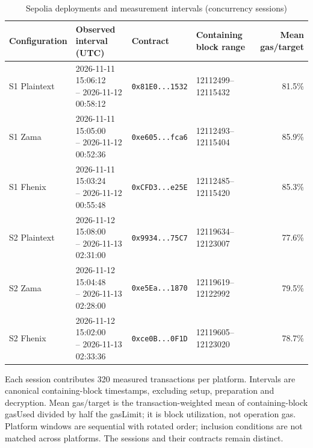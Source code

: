 \begin{table}[!t]
\caption{Sepolia deployments and measurement intervals (concurrency sessions)}
\label{tab:sepolia-concurrency-deployments}
\centering
\scriptsize
\setlength{\tabcolsep}{3pt}
\begin{tabular}{|l|l|l|l|r|}
\hline
\textbf{Configuration} & \textbf{Observed interval (UTC)} & \textbf{Contract} & \textbf{Containing block range} & \textbf{Mean gas/target} \\
\hline
S1 Plaintext & \shortstack[l]{2026-11-11 15:06:12 \\ -- 2026-11-12 00:58:12} & \texttt{0x81E0...1532} & 12112499--12115432 & 81.5\% \\
\hline
S1 Zama & \shortstack[l]{2026-11-11 15:05:00 \\ -- 2026-11-12 00:52:36} & \texttt{0xe605...fca6} & 12112493--12115404 & 85.9\% \\
\hline
S1 Fhenix & \shortstack[l]{2026-11-11 15:03:24 \\ -- 2026-11-12 00:55:48} & \texttt{0xCFD3...e25E} & 12112485--12115420 & 85.3\% \\
\hline
S2 Plaintext & \shortstack[l]{2026-11-12 15:08:00 \\ -- 2026-11-13 02:31:00} & \texttt{0x9934...75C7} & 12119634--12123007 & 77.6\% \\
\hline
S2 Zama & \shortstack[l]{2026-11-12 15:04:48 \\ -- 2026-11-13 02:28:00} & \texttt{0xe5Ea...1870} & 12119619--12122992 & 79.5\% \\
\hline
S2 Fhenix & \shortstack[l]{2026-11-12 15:02:00 \\ -- 2026-11-13 02:33:36} & \texttt{0xce0B...0F1D} & 12119605--12123020 & 78.7\% \\
\hline
\end{tabular}
\par\smallskip
\begin{minipage}{\textwidth}\scriptsize Each session contributes 320 measured transactions per platform. Intervals are canonical containing-block timestamps, excluding setup, preparation and decryption. Mean gas/target is the transaction-weighted mean of containing-block gasUsed divided by half the gasLimit; it is block utilization, not operation gas. Platform windows are sequential with rotated order; inclusion conditions are not matched across platforms. The sessions and their contracts remain distinct.\end{minipage}
\end{table}
